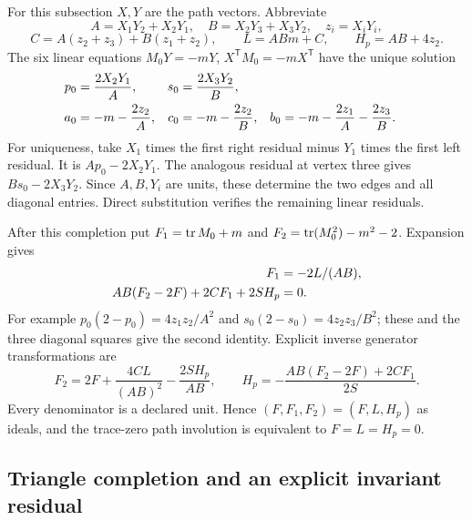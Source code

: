 \documentclass[11pt,a4paper]{article}
\theoremstyle{remark}\newtheorem{remark}[theorem]{Remark}
\begin{document}
For this subsection \(X,Y\) are the path vectors. Abbreviate
\[
 A=X_1Y_2+X_2Y_1,\quad B=X_2Y_3+X_3Y_2,\quad z_i=X_iY_i,
\]
\[
 C=A(z_2+z_3)+B(z_1+z_2),\qquad
 L=ABm+C,\qquad H_p=AB+4z_2.
\]
The six linear equations \(M_0Y=-mY\),
\(X^{\mathsf T}M_0=-mX^{\mathsf T}\) have the unique solution
\begin{align}
 p_0&=\frac{2X_2Y_1}{A},&s_0&=\frac{2X_3Y_2}{B},\notag\\
 a_0&=-m-\frac{2z_2}{A},&c_0&=-m-\frac{2z_2}{B},&
 b_0&=-m-\frac{2z_1}{A}-\frac{2z_3}{B}.
 \label{geometry:pathcompletion}
\end{align}
For uniqueness, take \(X_1\) times the first right residual minus
\(Y_1\) times the first left residual. It is
\(Ap_0-2X_2Y_1\). The analogous residual at vertex three gives
\(Bs_0-2X_3Y_2\). Since \(A,B,Y_i\) are units, these determine
the two edges and all diagonal entries. Direct substitution verifies the
remaining linear residuals.

After this completion put \(F_1=\operatorname{tr} M_0+m\) and
\(F_2=\operatorname{tr}(M_0^2)-m^2-2\). Expansion gives
\begin{align}
 F_1&=-2L/(AB),\notag\\
 AB(F_2-2F)+2CF_1+2SH_p&=0.
 \label{geometry:pathsyzygy}
\end{align}
For example \(p_0(2-p_0)=4z_1z_2/A^2\) and
\(s_0(2-s_0)=4z_2z_3/B^2\); these and the three diagonal squares
give the second identity. Explicit inverse generator transformations are
\[
 F_2=2F+\frac{4CL}{(AB)^2}-\frac{2SH_p}{AB},\qquad
 H_p=-\frac{AB(F_2-2F)+2CF_1}{2S}.
\]
Every denominator is a declared unit. Hence
\((F,F_1,F_2)=(F,L,H_p)\) as ideals, and the trace-zero path
involution is equivalent to \(F=L=H_p=0\).

\subsection{Triangle completion and an explicit invariant residual}
\end{document}
